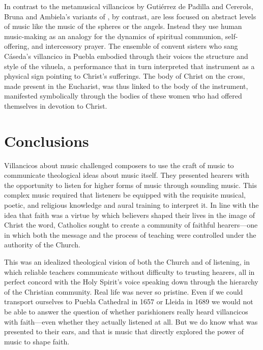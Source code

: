 
In contrast to the metamusical villancicos by Gutiérrez de Padilla and
Cererols, Bruna and Ambiela's variants of , by
contrast, are less focused on abstract levels of music like the music of the
spheres or the angels.
Instead they use human music-making as an analogy for the dynamics of spiritual
communion, self-offering, and intercessory prayer.
The ensemble of convent sisters who sang Cáseda's villancico in Puebla embodied
through their voices the structure and style of the vihuela, a performance that
in turn interpreted that instrument as a physical sign pointing to Christ's
sufferings.
The body of Christ on the cross, made present in the Eucharist, was thus linked
to the body of the instrument, manifested symbolically through the bodies of
these women who had offered themselves in devotion to Christ.


\section{Conclusions}

Villancicos about music challenged composers to use the craft of music to
communicate theological ideas about music itself.
They presented hearers with the opportunity to listen for higher forms of music
through sounding music.
This complex music required that listeners be equipped with the requisite
musical, poetic, and religious knowledge and aural training to interpret it.
In line with the idea that faith was a virtue by which believers shaped
their lives in the image of Christ the word, Catholics sought to create a
community of faithful hearers---one in which both the message and the process of
teaching were controlled under the authority of the Church.


This was an idealized theological vision of both the Church and of listening,
in which reliable teachers communicate without difficulty to trusting hearers,
all in perfect concord with the Holy Spirit's voice speaking down through the
hierarchy of the Christian community.
Real life was never so pristine.
Even if we could transport ourselves to Puebla Cathedral in 1657 or Lleida in
1689 we would not be able to answer the question of whether parishioners really
heard villancicos with faith---even whether they actually listened at all.
But we do know what was presented to their ears, and that is music that
directly explored the power of music to shape faith.

